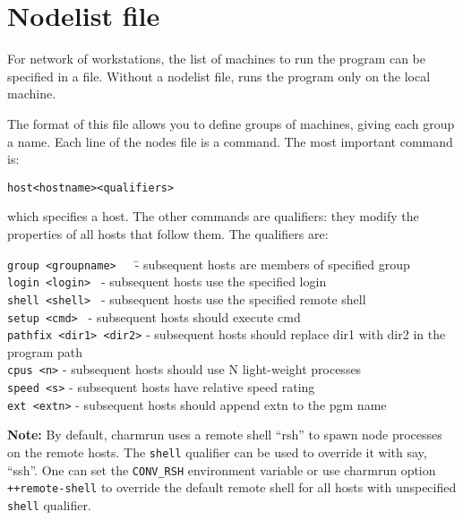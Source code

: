 \section{Nodelist file}

For network of workstations,
the list of machines to run the program can be specified in a file.  
Without a nodelist file, \charmpp{} runs the program only on the 
local machine.

The format of this file
allows you to define groups of machines, giving each group a name.
Each line of the nodes file is a command.  The most important command
is:

\begin{alltt}
host <hostname> <qualifiers>
\end{alltt}

which specifies a host.  The other commands are qualifiers: they modify
the properties of all hosts that follow them.  The qualifiers are:


\begin{tabbing}
{\tt group <groupname>}~~~\= - subsequent hosts are members of specified group\\
{\tt login <login>  }     \> - subsequent hosts use the specified login\\
{\tt shell <shell>  }     \> - subsequent hosts use the specified remote 
shell\\
{\tt setup <cmd>  }       \> - subsequent hosts should execute cmd\\
{\tt pathfix <dir1> <dir2>}         \> - subsequent hosts should replace dir1 with dir2 in the program path\\
{\tt cpus <n>}            \> - subsequent hosts should use N light-weight processes\\
{\tt speed <s>}           \> - subsequent hosts have relative speed rating\\
{\tt ext <extn>}          \> - subsequent hosts should append extn to the pgm name\\
\end{tabbing}

{\bf Note:}
By default, charmrun uses a remote shell ``rsh'' to spawn node processes
on the remote hosts. The {\tt shell} qualifier can be used to override
it with say, ``ssh''. One can set the {\tt CONV\_RSH} environment variable
or use charmrun option {\tt ++remote-shell} to override the default remote 
shell for all hosts with unspecified {\tt shell} qualifier.

